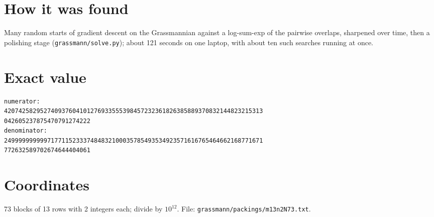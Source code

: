 \documentclass[11pt,a4paper]{article}
\begin{document}
\section{How it was found}
Many random starts of gradient descent on the Grassmannian against a log-sum-exp of the pairwise overlaps, sharpened over time, then a polishing stage (\texttt{grassmann/solve.py}); about 121 seconds on one laptop, with about ten such searches running at once.


\appendix
\section{Exact value}
{\small
\begin{verbatim}
numerator:
420742582952740937604101276933555398457232361826385889370832144823215313
042605237875470791274222
denominator:
249999999999717711523337484832100035785493534923571616765464662168771671
772632589702674644404061
\end{verbatim}}

\section{Coordinates}
73 blocks of 13 rows with 2 integers each; divide by $10^{12}$. File: \texttt{grassmann/packings/m13n2N73.txt}.
{\tiny
\begin{multicols}{4}
\end{multicols}}
\end{document}
